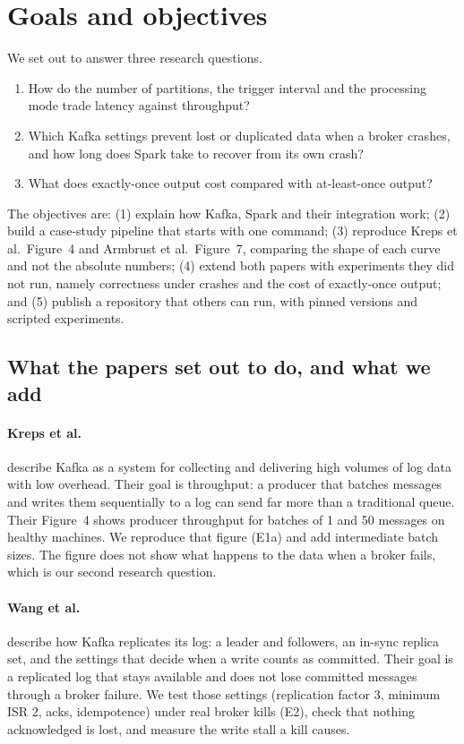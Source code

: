 \section{Goals and objectives}
We set out to answer three research questions.
\begin{enumerate}[label=\textbf{RQ\arabic*.},leftmargin=*]
  \item How do the number of partitions, the trigger interval and the processing mode trade latency
        against throughput?
  \item Which Kafka settings prevent lost or duplicated data when a broker crashes, and how long does
        Spark take to recover from its own crash?
  \item What does exactly-once output cost compared with at-least-once output?
\end{enumerate}
The objectives are: (1) explain how Kafka, Spark and their integration work; (2) build a case-study
pipeline that starts with one command; (3) reproduce Kreps et al.\ Figure~4 and Armbrust et al.\
Figure~7, comparing the shape of each curve and not the absolute numbers; (4) extend both papers with
experiments they did not run, namely correctness under crashes and the cost of exactly-once output;
and (5) publish a repository that others can run, with pinned versions and scripted experiments.

\subsection{What the papers set out to do, and what we add}
\label{sec:papergoals}
\paragraph{Kreps et al.~\cite{kreps2011}} describe Kafka as a system for collecting and delivering high volumes of
log data with low overhead. Their goal is throughput: a producer that batches messages and writes them
sequentially to a log can send far more than a traditional queue. Their Figure~4 shows producer throughput for
batches of 1 and 50 messages on healthy machines. We reproduce that figure (E1a) and add intermediate batch
sizes. The figure does not show what happens to the data when a broker fails, which is our second research
question.

\paragraph{Wang et al.~\cite{wang2015}} describe how Kafka replicates its log: a leader and followers, an
in-sync replica set, and the settings that decide when a write counts as committed. Their goal is a replicated
log that stays available and does not lose committed messages through a broker failure. We test those settings
(replication factor 3, minimum ISR 2, acks, idempotence) under real broker kills (E2), check that nothing
acknowledged is lost, and measure the write stall a kill causes.

